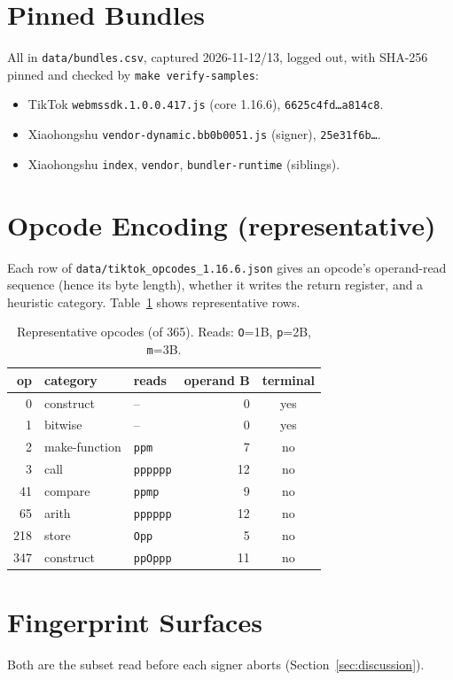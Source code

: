 \documentclass[conference,10pt]{IEEEtran}
\newcommand{\code}[1]{\texttt{\small #1}}
\begin{document}
\appendices
\section{Pinned Bundles}
All in \code{data/bundles.csv}, captured 2026-11-12/13, logged out, with SHA-256 pinned and checked by \code{make verify-samples}:
\begin{itemize}\footnotesize
  \item TikTok \code{webmssdk.1.0.0.417.js} (core 1.16.6), \code{6625c4fd{\ldots}a814c8}.
  \item Xiaohongshu \code{vendor-dynamic.bb0b0051.js} (signer), \code{25e31f6b{\ldots}}.
  \item Xiaohongshu \code{index}, \code{vendor}, \code{bundler-runtime} (siblings).
\end{itemize}

\section{Opcode Encoding (representative)}
Each row of \code{data/tiktok\_opcodes\_1.16.6.json} gives an opcode's operand-read sequence (hence its byte length), whether it writes the return register, and a heuristic category. Table~\ref{tab:opcodes} shows representative rows.

\begin{table}[h]
\caption{Representative opcodes (of 365). Reads: \code{O}=1B, \code{p}=2B, \code{m}=3B.}
\label{tab:opcodes}
\centering\footnotesize
\begin{tabular}{@{}rllrc@{}}
\toprule
op & category & reads & operand B & terminal \\
\midrule
0 & construct & -- & 0 & yes \\
1 & bitwise & -- & 0 & yes \\
2 & make-function & \code{ppm} & 7 & no \\
3 & call & \code{pppppp} & 12 & no \\
41 & compare & \code{ppmp} & 9 & no \\
65 & arith & \code{pppppp} & 12 & no \\
218 & store & \code{Opp} & 5 & no \\
347 & construct & \code{ppOppp} & 11 & no \\
\bottomrule
\end{tabular}
\end{table}

\section{Fingerprint Surfaces}
Both are the subset read before each signer aborts (Section~\ref{sec:discussion}).
\end{document}

